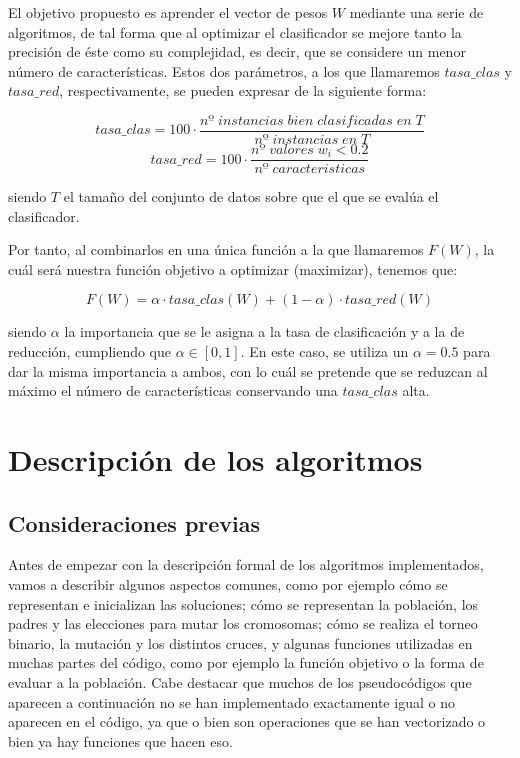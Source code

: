 \documentclass[11pt,a4paper]{article}
\begin{document}
El objetivo propuesto es aprender el vector de pesos $W$
mediante una serie de algoritmos, de tal forma que al optimizar el clasificador se mejore tanto la precisión de éste como su
complejidad, es decir, que se considere un menor número de características. Estos dos parámetros, a los que llamaremos $tasa\_
clas$ y $tasa\_red$, respectivamente, se pueden expresar de la siguiente forma:

\[tasa\_clas = 100 \cdot \frac{nº \; instancias \; bien \; clasificadas \; en \; T}{nº \; instancias \; en \; T}\]
\[tasa\_red = 100 \cdot \frac{nº \; valores \; w_i < 0.2}{nº \; caracteristicas}\]

\noindent siendo $T$ el tamaño del conjunto de datos sobre que el que se evalúa el clasificador.\par

Por tanto, al combinarlos en una única función a la que llamaremos $F(W)$, la cuál será nuestra función objetivo a optimizar
(maximizar), tenemos que:

\[F(W) = \alpha \cdot tasa\_clas(W) + (1 - \alpha) \cdot tasa\_red(W)\] 

\noindent siendo $\alpha$ la importancia que se le asigna a la tasa de clasificación y a la de reducción, cumpliendo que
$\alpha \in [0, 1]$. En este caso, se utiliza un $\alpha = 0.5$ para dar la misma importancia a ambos, con lo cuál se pretende
que se reduzcan al máximo el número de características conservando una $tasa\_clas$ alta.

\section{Descripción de los algoritmos}

\subsection{Consideraciones previas}

Antes de empezar con la descripción formal de los algoritmos implementados, vamos a describir algunos aspectos
comunes, como por ejemplo cómo se representan e inicializan las soluciones; cómo se representan la población, los padres y las
elecciones para mutar los cromosomas; cómo se realiza el torneo binario, la mutación y los distintos cruces, y algunas funciones
utilizadas en muchas partes del código, como por ejemplo la función objetivo o la forma de evaluar a la población. Cabe destacar
que muchos de los pseudocódigos que aparecen a continuación no se han implementado exactamente igual o no aparecen en el
código, ya que o bien son operaciones que se han vectorizado o bien ya hay funciones que hacen eso.
\end{document}
